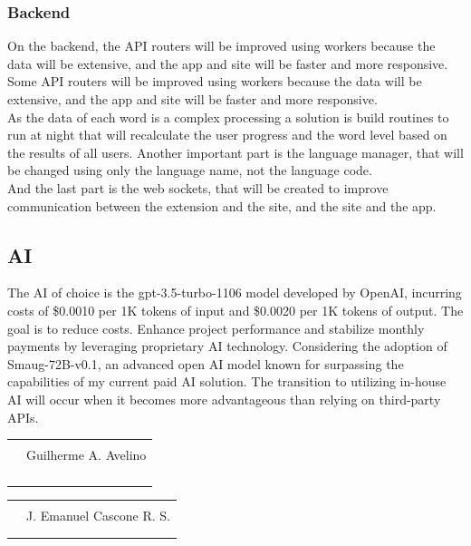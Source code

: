 \documentclass[12pt]{article}
\begin{document}
\subsubsection{Backend} 
On the backend, the API routers will be improved using workers because the data will be extensive, and the app and site will be faster and more responsive. \\
Some API routers will be improved using workers because the data will be extensive, and the app and site will be faster and more responsive. \\
As the data of each word is a complex processing a solution is build routines to run at night that will recalculate the user progress and the word level based on the results of all users.
Another important part is the language manager, that will be changed using only the language name, not the language code. \\
And the last part is the web sockets, that will be created to improve communication between the extension and the site, and the site and the app. \\

\subsection{AI}
The AI of choice is the gpt-3.5-turbo-1106 model developed by OpenAI, incurring costs of \$0.0010 per 1K tokens of input and \$0.0020 per 1K tokens of output. The goal is to reduce costs. Enhance project performance and stabilize monthly payments by leveraging proprietary AI technology. Considering the adoption of Smaug-72B-v0.1, an advanced open AI model known for surpassing the capabilities of my current paid AI solution. The transition to utilizing in-house AI will occur when it becomes more advantageous than relying on third-party APIs.




\centering
\break

\begin{tabular}{@{}p{.5in}p{4in}@{}}
& \hrulefill \\
& \centerline{Guilherme A. Avelino} \\
\\ \\ \\ \\ 
\end{tabular}

\centering
\begin{tabular}{@{}p{.5in}p{4in}@{}}
& \hrulefill \\
& \centerline{J. Emanuel Cascone R. S.} \\
\\ \\
\end{tabular}
\end{document}

